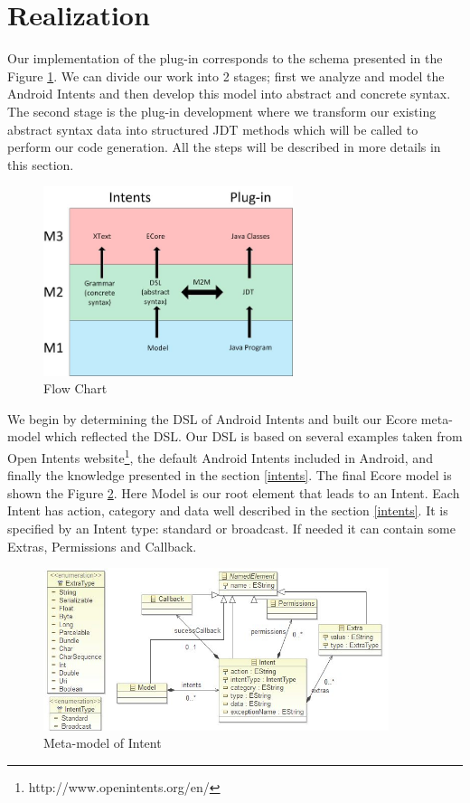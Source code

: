 \section{Realization}
\label{realisation}

Our implementation of the plug-in corresponds to the schema presented in the Figure \ref{flowchart}. We can divide our work into 2 stages; first we analyze and model the Android Intents and then develop this model into abstract and concrete syntax. The second stage is the plug-in development where we transform our existing abstract syntax data into structured JDT methods which will be called to perform our code generation. All the steps will be described in more details in this section.  

\begin{figure}[t]
\label{flowchart}
  \centering
    \includegraphics[width=0.65\textwidth]{flowchart}
  \caption{Flow Chart}
\end{figure}

We begin by determining the DSL of Android Intents and built our Ecore meta-model which reflected the DSL. Our DSL is based on several examples taken from Open Intents website\footnote{http://www.openintents.org/en/}, the default Android Intents included in Android, and finally the knowledge presented in the section \ref{intents}. The final Ecore model is shown the Figure \ref{meta-model}. Here Model is our root element that leads to an Intent. Each Intent has action, category and data well described in the section \ref{intents}. It is specified by an Intent type: standard or broadcast. If needed it can contain some Extras, Permissions and Callback.

\begin{figure}[t]
\label{meta-model}
  \centering
    \includegraphics[width=0.9\textwidth]{metamodel}
  \caption{Meta-model of Intent}
\end{figure}

